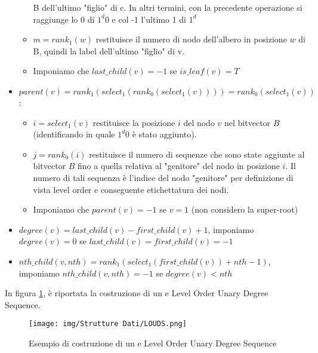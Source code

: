 \begin{itemize}
\begin{itemize}
                    B dell'ultimo "figlio" di c. In altri termini, con la
                    precedente operazione si raggiunge lo 0 di $1^d 0$ e col -1
                    l'ultimo 1 di $1^d$
              \item $m = rank_1(w)$ restituisce il numero di nodo dell'albero in
                    posizione $w$ di B, quindi la label dell'ultimo "figlio" di v.
              \item Imponiamo che $last\_child(v) = -1$ se $is\_leaf (v) = T$
          \end{itemize}
    \item $parent(v) = rank_1(select_1(rank_0(select_1(v)))) = rank_0(select_1(v))$:
          \begin{itemize}
              \item $i = select_1(v)$ restituisce la posizione $i$ del nodo $v$
                    nel bitvector $B$ (identificando in quale $1^d 0$ è stato
                    aggiunto).
              \item $j = rank_0(i)$ restituisce il numero di sequenze che sono
                    state aggiunte al bitvector $B$ fino a quella relativa al
                    "genitore" del nodo in posizione $i$. Il numero di tali
                    sequenza è l'indice del nodo "genitore" per definizione di
                    vista level order e conseguente etichettatura dei nodi.
              \item Imponiamo che $parent(v) = -1$ se $v = 1$ (non considero la
                    super-root)
          \end{itemize}
    \item $degree(v)=last\_child(v)-first\_child(v)+1$, imponiamo
          $degree(v) = 0$ se $last\_child(v) = first\_child(v) = -1$
    \item $nth\_child(v, nth) = rank_1(select_1(first\_child(v)) + nth - 1)$,
          imponiamo $nth\_child(v, nth) = -1$ se $degree(v) < nth$
\end{itemize}
\begin{esempio}
    In figura \ref{fig:louds}, è riportata la costruzione di un e Level Order
    Unary Degree Sequence.
    \begin{figure}[!ht]
        \centering
        \texttt{[image: img/Strutture Dati/LOUDS.png]}
        \caption{Esempio di costruzione di un e Level Order Unary Degree Sequence}
        \label{fig:louds}
    \end{figure}
\end{esempio}
